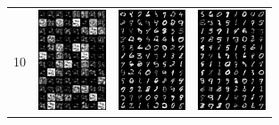 \documentclass[conference]{IEEEtran}
\begin{document}
\begin{figure}[H]
\begin{tabular}{cccc}
		10 &
		\includegraphics[width=2cm]{fig/mnist-10-false.png}&
		\includegraphics[width=2cm]{fig/mnist-10-true.png}&
		\includegraphics[width=2cm]{fig/mnist-10-vae.png}
        \end{tabular}
\end{figure}
\end{document}
